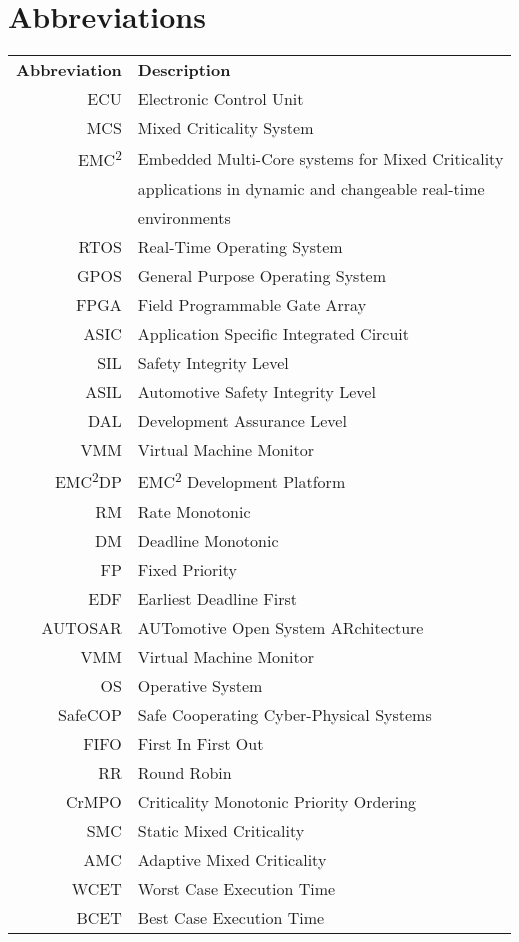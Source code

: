 \chapter*{Abbreviations}
\begin{tabular}{r l}
\textbf{Abbreviation} 	& \textbf{Description} \vspace{.5em} \\
ECU		&Electronic Control Unit\\
MCS		&Mixed Criticality System\\
EMC\textsuperscript{2}	&Embedded Multi-Core systems for Mixed Criticality\\
 		&applications in dynamic and changeable real-time\\
 		&environments\\
RTOS	&Real-Time Operating System\\
GPOS	&General Purpose Operating System\\
FPGA	&Field Programmable Gate Array\\
ASIC	&Application Specific Integrated Circuit\\
SIL		&Safety Integrity Level\\
ASIL	&Automotive Safety Integrity Level\\
DAL		&Development Assurance Level\\
VMM		&Virtual Machine Monitor\\
EMC\textsuperscript{2}DP	&EMC\textsuperscript{2} Development Platform\\
RM		&Rate Monotonic\\
DM		&Deadline Monotonic\\
FP		&Fixed Priority\\
EDF		&Earliest Deadline First\\
AUTOSAR	&AUTomotive Open System ARchitecture\\
VMM		&Virtual Machine Monitor\\
OS		&Operative System\\
SafeCOP	&Safe Cooperating Cyber-Physical Systems\\
FIFO	&First In First Out\\
RR		&Round Robin\\
CrMPO	&Criticality Monotonic Priority Ordering\\
SMC		&Static Mixed Criticality\\
AMC		&Adaptive Mixed Criticality\\
WCET	&Worst Case Execution Time\\
BCET	&Best Case Execution Time\\

\end{tabular}

